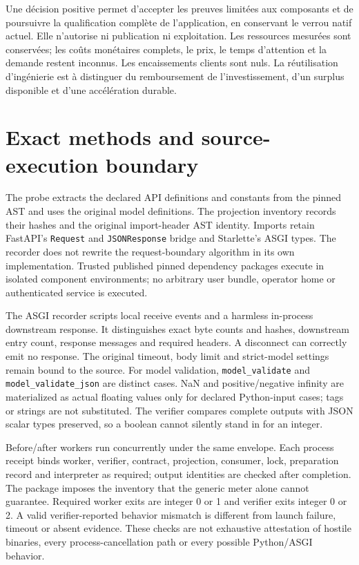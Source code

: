 \documentclass[11pt,a4paper]{article}
\begin{document}
Une d\'ecision positive permet d'accepter les preuves limit\'ees aux composants et de poursuivre la qualification compl\`ete de l'application, en conservant le verrou natif actuel. Elle n'autorise ni publication ni exploitation. Les ressources mesur\'ees sont conserv\'ees; les co\^uts mon\'etaires complets, le prix, le temps d'attention et la demande restent inconnus. Les encaissements clients sont nuls. La r\'eutilisation d'ing\'enierie est \`a distinguer du remboursement de l'investissement, d'un surplus disponible et d'une acc\'el\'eration durable.

\appendix
\section{Exact methods and source-execution boundary}

The probe extracts the declared API definitions and constants from the pinned AST and uses the original model definitions. The projection inventory records their hashes and the original import-header AST identity. Imports retain FastAPI's \texttt{Request} and \texttt{JSONResponse} bridge and Starlette's ASGI types. The recorder does not rewrite the request-boundary algorithm in its own implementation. Trusted published pinned dependency packages execute in isolated component environments; no arbitrary user bundle, operator home or authenticated service is executed.\cite{contract,companion}

The ASGI recorder scripts local receive events and a harmless in-process downstream response. It distinguishes exact byte counts and hashes, downstream entry count, response messages and required headers. A disconnect can correctly emit no response. The original timeout, body limit and strict-model settings remain bound to the source. For model validation, \texttt{model\_validate} and \texttt{model\_validate\_json} are distinct cases. NaN and positive/negative infinity are materialized as actual floating values only for declared Python-input cases; tags or strings are not substituted. The verifier compares complete outputs with JSON scalar types preserved, so a boolean cannot silently stand in for an integer.\cite{contract}

Before/after workers run concurrently under the same envelope. Each process receipt binds worker, verifier, contract, projection, consumer, lock, preparation record and interpreter as required; output identities are checked after completion. The package imposes the inventory that the generic meter alone cannot guarantee. Required worker exits are integer 0 or 1 and verifier exits integer 0 or 2. A valid verifier-reported behavior mismatch is different from launch failure, timeout or absent evidence. These checks are not exhaustive attestation of hostile binaries, every process-cancellation path or every possible Python/ASGI behavior.\cite{controls,criticism}
\end{document}

